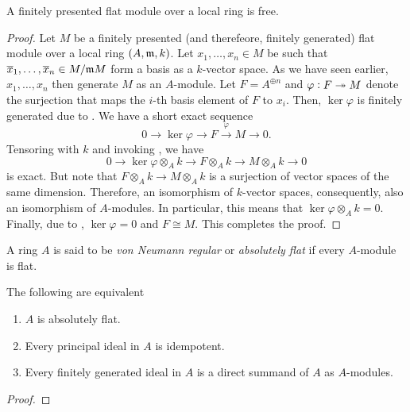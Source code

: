 \begin{lemma}
    A finitely presented flat module over a local ring is free.
\end{lemma}
\begin{proof}
    Let $M$ be a finitely presented (and therefeore, finitely generated) flat module over a local ring $(A,\mathfrak m, k)$. Let $x_1,\dots,x_n\in M$ be such that $\overline x_1,\dots,\overline x_n\in M/\mathfrak m M$ form a basis as a $k$-vector space. As we have seen earlier, $x_1,\dots,x_n$ then generate $M$ as an $A$-module. Let $F = A^{\oplus n}$ and $\varphi: F\twoheadrightarrow M$ denote the surjection that maps the $i$-th basis element of $F$ to $x_i$. Then, $\ker\varphi$ is finitely generated due to . We have a short exact sequence 
    \begin{equation*}
        0\longrightarrow\ker\varphi\longrightarrow F\stackrel{\varphi}{\longrightarrow}M\longrightarrow 0.
    \end{equation*}
    Tensoring with $k$ and invoking , we have 
    \begin{equation*}
        0\longrightarrow\ker\varphi\otimes_A k\longrightarrow F\otimes_A k\longrightarrow M\otimes_A k\longrightarrow 0
    \end{equation*}
    is exact. But note that $F\otimes_A k\longrightarrow M\otimes_A k$ is a surjection of vector spaces of the same dimension. Therefore, an isomorphism of $k$-vector spaces, consequently, also an isomorphism of $A$-modules. In particular, this means that $\ker\varphi\otimes_A k = 0$. Finally, due to , $\ker\varphi = 0$ and $F\cong M$. This completes the proof.
\end{proof}

\begin{definition}
    A ring $A$ is said to be \emph{von Neumann regular} or \emph{absolutely flat} if every $A$-module is flat.
\end{definition}

\begin{theorem}
    The following are equivalent
    \begin{enumerate}[label=(\alph*)]
        \item $A$ is absolutely flat. 
        \item Every principal ideal in $A$ is idempotent. 
        \item Every finitely generated ideal in $A$ is a direct summand of $A$ as $A$-modules.
    \end{enumerate}
\end{theorem}
\begin{proof}
    
\end{proof}

